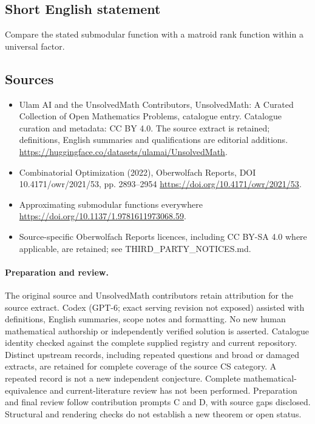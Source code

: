 \documentclass[11pt]{article}
\begin{document}
\subsection{Short English statement}
Compare the stated submodular function with a matroid rank function within a universal factor.
\subsection{Sources}
\begin{itemize}
\item[\hypertarget{source:statement:1}{S1}] Ulam AI and the UnsolvedMath Contributors, UnsolvedMath: A Curated Collection of Open Mathematics Problems, catalogue entry. Catalogue curation and metadata: CC BY 4.0. The source extract is retained; definitions, English summaries and qualifications are editorial additions.
\url{https://huggingface.co/datasets/ulamai/UnsolvedMath}.
\item[\hypertarget{source:statement:2}{S2}] Combinatorial Optimization (2022), Oberwolfach Reports, DOI 10.4171/owr/2021/53, pp. 2893--2954
\url{https://doi.org/10.4171/owr/2021/53}.
\item[\hypertarget{source:statement:3}{S3}] Approximating submodular functions everywhere
\url{https://doi.org/10.1137/1.9781611973068.59}.
\item Source-specific Oberwolfach Reports licences, including CC BY-SA 4.0 where applicable, are retained; see THIRD\_PARTY\_NOTICES.md.
\end{itemize}
\paragraph{Preparation and review.}
The original source and UnsolvedMath contributors retain attribution for the source extract. Codex (GPT-6; exact serving revision not exposed) assisted with definitions, English summaries, scope notes and formatting. No new human mathematical authorship or independently verified solution is asserted. Catalogue identity checked against the complete supplied registry and current repository. Distinct upstream records, including repeated questions and broad or damaged extracts, are retained for complete coverage of the source CS category. A repeated record is not a new independent conjecture. Complete mathematical-equivalence and current-literature review has not been performed. Preparation and final review follow contribution prompts C and D, with source gaps disclosed. Structural and rendering checks do not establish a new theorem or open status.
\label{end:statement}
\end{document}
